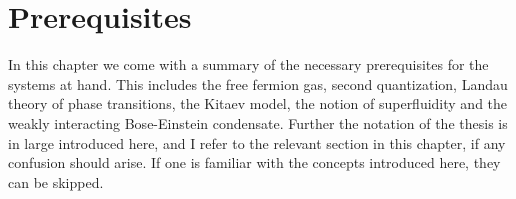 \chapter{Prerequisites}

\label{Chapter2}


In this chapter we come with a summary of the necessary prerequisites for the systems at hand. This includes the free fermion gas, second quantization, Landau theory of phase transitions, the Kitaev model, the notion of superfluidity and the weakly interacting Bose-Einstein condensate. Further the notation of the thesis is in large introduced here, and I refer to the relevant section in this chapter, if any confusion should arise. If one is familiar with the concepts introduced here, they can be skipped. 

